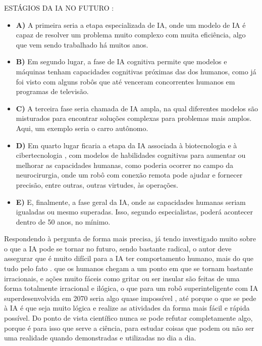 \documentclass[a4paper]{report}
\begin{document}
ESTÁGIOS DA \ac{IA} NO FUTURO  :
\begin{itemize}
\item \textbf{A)} A primeira seria a etapa especializada de \ac{IA}, onde um modelo de \ac{IA} é capaz de resolver um problema muito complexo com muita eficiência, algo que vem sendo trabalhado há muitos anos.
\item \textbf{B)} Em segundo lugar, a fase de \ac{IA} cognitiva permite que modelos e máquinas tenham capacidades cognitivas próximas das dos humanos, como já foi visto com alguns robôs que até venceram concorrentes humanos em programas de televisão.
\item \textbf{C)} A terceira fase seria chamada de \ac{IA} ampla, na qual diferentes modelos são misturados para encontrar soluções complexas para problemas mais amplos. Aqui, um exemplo seria o carro autônomo.
\item \textbf{D)} Em quarto lugar ficaria a etapa da \ac{IA} associada à biotecnologia e à cibertecnologia , com modelos de habilidades cognitivas para aumentar ou melhorar as capacidades humanas, como poderia ocorrer no campo da neurocirurgia, onde um robô com conexão remota pode ajudar e fornecer precisão, entre outras, outras virtudes, às operações.
\item \textbf{E)} E, finalmente, a fase geral da \ac{IA}, onde as capacidades humanas seriam igualadas ou mesmo superadas. Isso, segundo especialistas, poderá acontecer dentro de 50 anos, no mínimo.
\end{itemize}

Respondendo à pergunta  de forma mais precisa, já tendo investigado muito sobre o que a \ac{IA} pode se tornar no futuro, sendo bastante radical, o autor deve assegurar que é muito difícil para a \ac{IA} ter comportamento humano, mais do que tudo pelo fato . que os humanos chegam a um ponto em que se tornam bastante irracionais, e ações muito fáceis como gritar ou ser insular são feitas de uma forma totalmente irracional e ilógica, o que para um robô superinteligente com \ac{IA} superdesenvolvida em 2070 seria algo quase impossível , até porque o que se pede à \ac{IA} é que seja muito lógica e realize as atividades da forma mais fácil e rápida possível.
Do ponto de vista científico nunca se pode refutar completamente algo, porque é para isso que serve a ciência, para estudar coisas que podem ou não ser uma realidade quando demonstradas e utilizadas no dia a dia.\\
    
\end{document}
